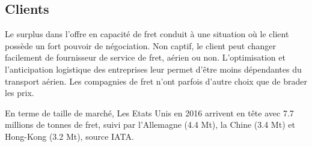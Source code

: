 \subsection{Clients}

Le surplus dans l'offre en capacité de fret conduit à une situation où le client
possède un fort pouvoir de négociation. Non captif, le client peut changer facilement de fournisseur de service de fret, aérien ou non. L'optimisation et l'anticipation logistique des entreprises leur permet d'être moins dépendantes du transport aérien. Les compagnies de fret n'ont parfois d'autre choix que de brader les prix.

En terme de taille de marché, Les Etats Unis en 2016 arrivent en tête avec 7.7 millions de tonnes de fret, suivi par l'Allemagne (4.4 Mt), la Chine (3.4 Mt) et Hong-Kong (3.2 Mt), source IATA.

